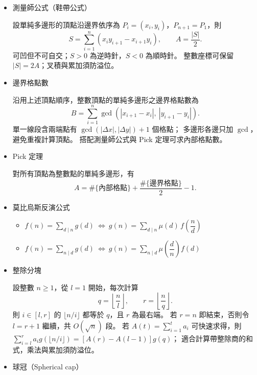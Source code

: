 \begin{itemize}
一序列 $(a_1,b_1),\ldots,(a_n,b_n)$（非負整數對，且 $a_1\ge\cdots\ge a_n$）為有向圖可實現之入出度序列，當且僅當
\[
\begin{aligned}
\sum_{i=1}^n a_i &= \sum_{i=1}^n b_i,\\
\sum_{i=1}^k a_i &\le \sum_{i=1}^k\min(b_i,k-1)
  +\sum_{i=k+1}^n\min(b_i,k).
\end{aligned}
\]
其中不等式須對所有 $1\le k\le n$ 成立。

\item 測量師公式（鞋帶公式）

設單純多邊形的頂點沿邊界依序為
$P_i=(x_i,y_i)$，$P_{n+1}=P_1$，則
\[
S=\sum_{i=1}^{n}(x_i y_{i+1}-x_{i+1}y_i),
\qquad A=\frac{|S|}{2}.
\]
可凹但不可自交；$S>0$ 為逆時針，$S<0$ 為順時針。
整數座標可保留 $|S|=2A$；叉積與累加須防溢位。

\item 邊界格點數

沿用上述頂點順序，整數頂點的單純多邊形之邊界格點數為
\[
B=\sum_{i=1}^{n}\gcd\!\left(|x_{i+1}-x_i|,\ |y_{i+1}-y_i|\right).
\]
單一線段含兩端點有 $\gcd(|\Delta x|,|\Delta y|)+1$ 個格點；
多邊形各邊只加 $\gcd$，避免重複計算頂點。
搭配測量師公式與 Pick 定理可求內部格點數。

\item Pick 定理

對所有頂點為整數點的單純多邊形，有
\[
A=\#\{\text{內部格點}\}+\frac{\#\{\text{邊界格點}\}}{2}-1.
\]

\item 莫比烏斯反演公式

\begin{itemize}
  \item $f(n)=\sum_{d\mid n}g(d)\ \Leftrightarrow\ g(n)=\sum_{d\mid n}\mu(d)\,f\!\left(\dfrac{n}{d}\right)$
  \item $f(n)=\sum_{n\mid d}g(d)\ \Leftrightarrow\ g(n)=\sum_{n\mid d}\mu\!\left(\dfrac{d}{n}\right)f(d)$
\end{itemize}

\item 整除分塊

設整數 $n\ge1$，從 $l=1$ 開始，每次計算
\[
q=\left\lfloor\frac nl\right\rfloor,\qquad
r=\left\lfloor\frac nq\right\rfloor.
\]
則 $i\in[l,r]$ 的 $\lfloor n/i\rfloor$ 都等於 $q$，且 $r$ 為最右端。
若 $r=n$ 即結束，否則令 $l=r+1$ 繼續，共 $O(\sqrt n)$ 段。
若 $A(t)=\sum_{i=1}^{t}a_i$ 可快速求得，則
$\sum_{i=l}^{r}a_i g(\lfloor n/i\rfloor)=[A(r)-A(l-1)]g(q)$；
適合計算帶整除商的和式，乘法與累加須防溢位。

\item 球冠（Spherical cap）


\end{itemize}
